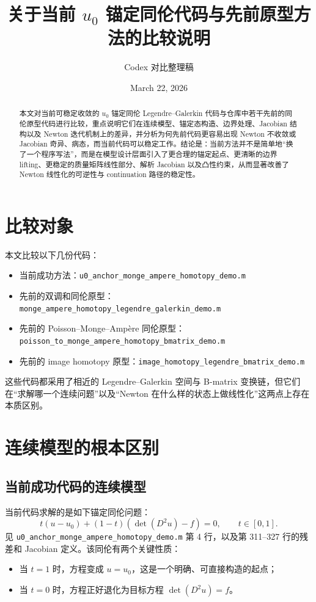 \documentclass[11pt,a4paper]{article}
\title{关于当前 \texorpdfstring{$u_0$}{u0} 锚定同伦代码与先前原型方法的比较说明}
\author{Codex 对比整理稿}
\date{March 22, 2026}
\begin{document}
\maketitle

\begin{abstract}
本文对当前可稳定收敛的 $u_0$ 锚定同伦 Legendre--Galerkin 代码与仓库中若干先前的同伦原型代码进行比较，重点说明它们在连续模型、锚定态构造、边界处理、Jacobian 结构以及 Newton 迭代机制上的差异，并分析为何先前代码更容易出现 Newton 不收敛或 Jacobian 奇异、病态，而当前代码可以稳定工作。结论是：当前方法并不是简单地“换了一个程序写法”，而是在模型设计层面引入了更合理的锚定起点、更清晰的边界 lifting、更稳定的质量矩阵线性部分、解析 Jacobian 以及凸性约束，从而显著改善了 Newton 线性化的可逆性与 continuation 路径的稳定性。
\end{abstract}

\section{比较对象}
本文比较以下几份代码：
\begin{itemize}[leftmargin=2em]
\item 当前成功方法：\texttt{u0\_anchor\_monge\_ampere\_homotopy\_demo.m}
\item 先前的双调和同伦原型：\texttt{monge\_ampere\_homotopy\_legendre\_galerkin\_demo.m}
\item 先前的 Poisson--Monge--Amp\`ere 同伦原型：\\
\texttt{poisson\_to\_monge\_ampere\_homotopy\_bmatrix\_demo.m}
\item 先前的 image homotopy 原型：\texttt{image\_homotopy\_legendre\_bmatrix\_demo.m}
\end{itemize}

这些代码都采用了相近的 Legendre--Galerkin 空间与 B-matrix 变换链，但它们在“求解哪一个连续问题”以及“Newton 在什么样的状态上做线性化”这两点上存在本质区别。

\section{连续模型的根本区别}
\subsection{当前成功代码的连续模型}
当前代码求解的是如下锚定同伦问题：
\begin{equation}
t(u-u_0)+(1-t)(\det(D^2u)-f)=0,
\qquad t\in[0,1].
\label{eq:new_homotopy}
\end{equation}
见 \texttt{u0\_anchor\_monge\_ampere\_homotopy\_demo.m} 第 4 行，以及第 311--327 行的残差和 Jacobian 定义。该同伦有两个关键性质：
\begin{itemize}[leftmargin=2em]
\item 当 $t=1$ 时，方程变成 $u=u_0$，这是一个明确、可直接构造的起点；
\item 当 $t=0$ 时，方程正好退化为目标方程 $\det(D^2u)=f$。
\end{itemize}
\end{document}
